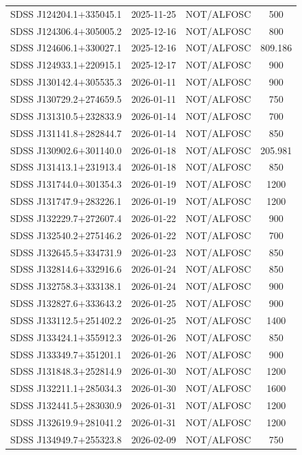 \begin{longtable}{cccc}
SDSS J124204.1$+$335045.1 & 2025-11-25 & NOT/ALFOSC & 500 \\
SDSS J124306.4$+$305005.2 & 2025-12-16 & NOT/ALFOSC & 800 \\
SDSS J124606.1$+$330027.1 & 2025-12-16 & NOT/ALFOSC & 809.186 \\
SDSS J124933.1$+$220915.1 & 2025-12-17 & NOT/ALFOSC & 900 \\
SDSS J130142.4$+$305535.3 & 2026-01-11 & NOT/ALFOSC & 900 \\
SDSS J130729.2$+$274659.5 & 2026-01-11 & NOT/ALFOSC & 750 \\
SDSS J131310.5$+$232833.9 & 2026-01-14 & NOT/ALFOSC & 700 \\
SDSS J131141.8$+$282844.7 & 2026-01-14 & NOT/ALFOSC & 850 \\
SDSS J130902.6$+$301140.0 & 2026-01-18 & NOT/ALFOSC & 205.981 \\
SDSS J131413.1$+$231913.4 & 2026-01-18 & NOT/ALFOSC & 850 \\
SDSS J131744.0$+$301354.3 & 2026-01-19 & NOT/ALFOSC & 1200 \\
SDSS J131747.9$+$283226.1 & 2026-01-19 & NOT/ALFOSC & 1200 \\
SDSS J132229.7$+$272607.4 & 2026-01-22 & NOT/ALFOSC & 900 \\
SDSS J132540.2$+$275146.2 & 2026-01-22 & NOT/ALFOSC & 700 \\
SDSS J132645.5$+$334731.9 & 2026-01-23 & NOT/ALFOSC & 850 \\
SDSS J132814.6$+$332916.6 & 2026-01-24 & NOT/ALFOSC & 850 \\
SDSS J132758.3$+$333138.1 & 2026-01-24 & NOT/ALFOSC & 900 \\
SDSS J132827.6$+$333643.2 & 2026-01-25 & NOT/ALFOSC & 900 \\
SDSS J133112.5$+$251402.2 & 2026-01-25 & NOT/ALFOSC & 1400 \\
SDSS J133424.1$+$355912.3 & 2026-01-26 & NOT/ALFOSC & 850 \\
SDSS J133349.7$+$351201.1 & 2026-01-26 & NOT/ALFOSC & 900 \\
SDSS J131848.3$+$252814.9 & 2026-01-30 & NOT/ALFOSC & 1200 \\
SDSS J132211.1$+$285034.3 & 2026-01-30 & NOT/ALFOSC & 1600 \\
SDSS J132441.5$+$283030.9 & 2026-01-31 & NOT/ALFOSC & 1200 \\
SDSS J132619.9$+$281041.2 & 2026-01-31 & NOT/ALFOSC & 1200 \\
SDSS J134949.7$+$255323.8 & 2026-02-09 & NOT/ALFOSC & 750 \\

\end{longtable}

